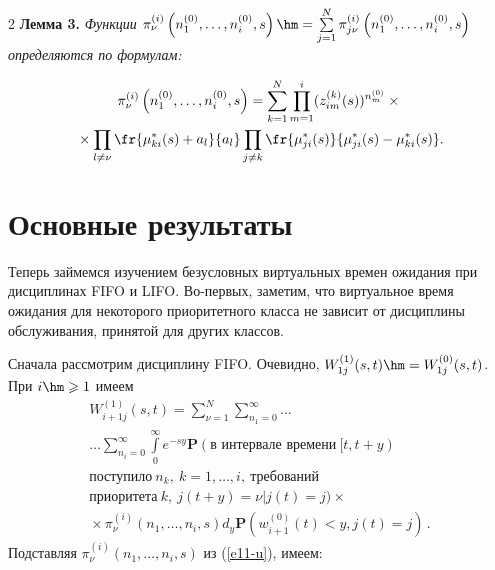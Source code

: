 \begin{multicols}{2}
\noindent
\textbf{Лемма 3.} \textit{Функции  $\pi_{\nu}^{(i)}\left(n_1^{(0)},\ldots,n_i^{(0)},s\right)
\hm=\sum\limits_{j=1}^N \pi_{j\nu}^{(i)}\left(n_1^{(0)},\ldots,n_i^{(0)},s\right)$ определяются по фор\-мулам:}

\noindent
\begin{multline}
\label{e11-u}
\pi_{\nu}^{(i)}\left(n_1^{(0)},\ldots,n_i^{(0)},s\right)=
\sum\limits_{k=1}^N\prod\limits_{m=1}^i (z_{im}^{(k)}(s))^{n_m^{(0)}}\times{}\\
{}\times
\prod_{l\ne \nu}\fr{\mu_{ki}^{*}(s)+a_l}{a_l}\prod_{j\ne k}\fr{\mu_{ji}^{*}(s)}{\mu_{ji}^{*}(s)-\mu_{ki}^{*}(s)}.
\end{multline}


\section{Основные результаты}

Теперь займемся изучением безусловных виртуальных времен ожидания 
при дисциплинах FIFO и LIFO. Во-пер\-вых, заметим, что виртуальное время
ожидания для некоторого приоритетного класса не зависит от дисциплины обслуживания, 
принятой для других классов.

Сначала рассмотрим дисциплину
FIFO. Очевидно, $W_{1j}^{(1)}(s,t)\hm=W_{1j}^{(0)}(s,t)$. При $i\hm\geqslant 1$ имеем
\begin{multline*}
W_{i+1j}^{(1)}(s,t)=
\sum\limits_{\nu=1}^N\sum\limits_{n_1=0}^{\infty}\ldots\\
\ldots\sum\limits_{n_i=0}^{\infty}\int\limits_0^{\infty}
e^{-sy}\mathbf{P}(\mbox{в интервале времени}\ [t,t+y)\\
 \mbox{поступило}\ n_k,\:k=1,\ldots,i,\ \mbox{требований}\\
 \mbox{приоритета}\ k, \ j(t+y)=\nu|j(t)=j)\times{}\\
 {}\times\pi_{\nu}^{(i)}\left(n_1,\ldots,n_i,s\right)d_y
 \mathbf{P}(w_{i+1}^{(0)}(t)<y,j(t)=j)\,.
\end{multline*}
Подставляя $\pi_{\nu}^{(i)}\left(n_1,\ldots,n_i,s\right)$ из (\ref{e11-u}), имеем:


\end{multicols}
